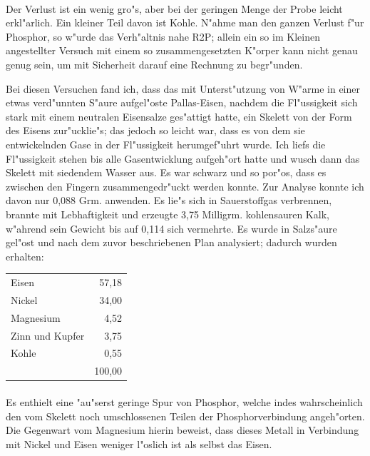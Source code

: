 \documentclass[a4paper, 11pt, oneside]{article}
\begin{document}
\paragraph{}
Der Verlust ist ein wenig gro"s, aber bei der geringen Menge der Probe leicht erkl"arlich. Ein kleiner Teil davon ist Kohle. N"ahme man den ganzen Verlust f"ur Phosphor, so w"urde das Verh"altnis nahe R2P; allein ein so im Kleinen angestellter Versuch mit einem so zusammengesetzten K"orper kann nicht genau genug sein, um mit Sicherheit darauf eine Rechnung zu begr"unden.

Bei diesen Versuchen fand ich, dass das mit Unterst"utzung von W"arme in einer etwas verd"unnten S"aure aufgel"oste Pallas-Eisen, nachdem die Fl"ussigkeit sich stark mit einem neutralen Eisensalze ges"attigt hatte, ein Skelett von der Form des Eisens zur"ucklie"s; das jedoch so leicht war, dass es von dem sie entwickelnden Gase in der Fl"ussigkeit herumgef"uhrt wurde. Ich liefs die Fl"ussigkeit stehen bis alle Gasentwicklung aufgeh"ort hatte und wusch dann das Skelett mit siedendem Wasser aus. Es war schwarz und so por"os, dass es zwischen den Fingern zusammengedr"uckt werden konnte. Zur Analyse konnte ich davon nur 0,088 Grm. anwenden. Es lie"s sich in Sauerstoffgas verbrennen, brannte mit Lebhaftigkeit und erzeugte 3,75 Milligrm. kohlensauren Kalk, w"ahrend sein Gewicht bis auf 0,114 sich vermehrte. Es wurde in Salzs"aure gel"ost und nach dem zuvor beschriebenen Plan analysiert; dadurch wurden erhalten:
\begin{center}
\begin{tabular}{ l r }
    Eisen & 57,18\\
    Nickel & 34,00\\
    Magnesium & 4,52\\
    Zinn und Kupfer & 3,75\\
    Kohle & 0,55\\
     & 100,00\\
\end{tabular}
\end{center}
\paragraph{}
Es enthielt eine "au"serst geringe Spur von Phosphor, welche indes wahrscheinlich den vom Skelett noch umschlossenen Teilen der Phosphorverbindung angeh"orten. Die Gegenwart vom Magnesium hierin beweist, dass dieses Metall in Verbindung mit Nickel und Eisen weniger l"oslich ist als selbst das Eisen.
\end{document}
